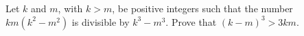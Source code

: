 Let $k$ and $m$,  with $k > m$,  be positive integers such that the number $km(k^2 - m^2)$ is divisible by $k^3 - m^3$. Prove that $(k - m)^3 > 3km$.